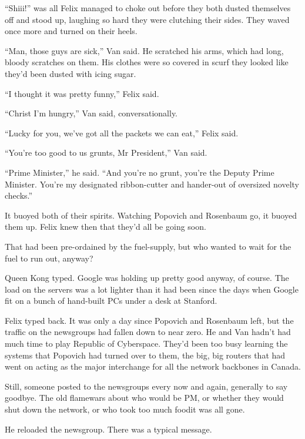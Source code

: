 “Shiii\dash{}!” was all Felix managed to choke out before they both
dusted themselves off and stood up, laughing so hard they were
clutching their sides. They waved once more and turned on their
heels.

“Man, those guys are sick,” Van said. He scratched his arms, which
had long, bloody scratches on them. His clothes were so covered in
scurf they looked like they’d been dusted with icing sugar.

“I thought it was pretty funny,” Felix said.

“Christ I’m hungry,” Van said, conversationally.

“Lucky for you, we’ve got all the packets we can eat,” Felix said.

“You’re too good to us grunts, Mr President,” Van said.

“Prime Minister,” he said. “And you’re no grunt, you’re the Deputy
Prime Minister. You’re my designated ribbon-cutter and hander-out
of oversized novelty checks.”

It buoyed both of their spirits. Watching Popovich and Rosenbaum
go, it buoyed them up. Felix knew then that they’d all be going
soon.

That had been pre-ordained by the fuel-supply, but who wanted to
wait for the fuel to run out, anyway?

\tb

Queen Kong typed. Google was holding up pretty good anyway, of
course. The load on the servers was a lot lighter than it had been
since the days when Google fit on a bunch of hand-built PCs under a
desk at Stanford.

Felix typed back. It was only a day since Popovich and Rosenbaum
left, but the traffic on the newsgroups had fallen down to near
zero. He and Van hadn’t had much time to play Republic of
Cyberspace. They’d been too busy learning the systems that Popovich
had turned over to them, the big, big routers that had went on
acting as the major interchange for all the network backbones in
Canada.

Still, someone posted to the newsgroups every now and again,
generally to say goodbye. The old flamewars about who would be PM,
or whether they would shut down the network, or who took too much
food\dash{}it was all gone.

He reloaded the newsgroup. There was a typical message.

